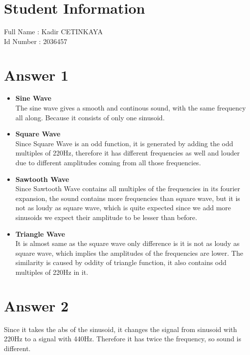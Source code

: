\documentclass[12pt]{article}
\begin{document}
\section*{Student Information } 
Full Name :  Kadir CETINKAYA \\
Id Number :  2036457

\section*{Answer 1}
\begin{itemize}
	\item \textbf{Sine Wave}\\
	The sine wave gives a smooth and continous sound, with the same frequency all along.
	Because it consists of only one sinusoid.

	\item \textbf{Square Wave}\\
	Since Square Wave is an odd function, it is generated by adding the odd multiples of
	220Hz, therefore it has different frequencies as well and louder due to different amplitudes
	coming from all those frequencies.

\item \textbf{Sawtooth Wave}\\
Since Sawtooth Wave contains all multiples of the frequencies in its fourier expansion,
the sound contains more frequencies than square wave, but it is not as loudy as square
wave, which is quite expected since we add more sinusoids we expect their amplitude to be
lesser than before.

\item \textbf{Triangle Wave}\\
It is almost same as the square wave only difference is it is not as loudy as square wave,
which implies the amplitudes of the frequencies are lower. The similarity is caused by oddity of
triangle function, it also contains odd multiples of 220Hz in it.
\end{itemize}


\section*{Answer 2}
Since it takes the abs of the sinusoid, it changes the signal from sinusoid with 220Hz to
a signal with 440Hz. Therefore it has twice the frequency, so sound is different.
\end{document}
